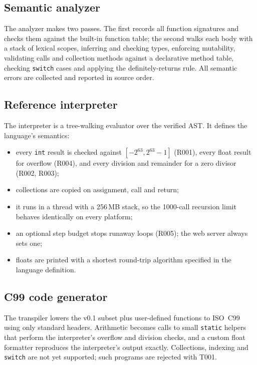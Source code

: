 \documentclass[conference]{IEEEtran}
\begin{document}
\subsection{Semantic analyzer}
The analyzer makes two passes. The first records all function signatures and checks them against the
built-in function table; the second walks each body with a stack of lexical scopes, inferring and checking
types, enforcing mutability, validating calls and collection methods against a declarative method table,
checking \texttt{switch} cases and applying the definitely-returns rule. All semantic errors are collected and
reported in source order.

\subsection{Reference interpreter}
The interpreter is a tree-walking evaluator over the verified AST. It defines the language's semantics:
\begin{itemize}
  \item every \texttt{int} result is checked against $[-2^{63}, 2^{63}-1]$ (R001), every float result for
        overflow (R004), and every division and remainder for a zero divisor (R002, R003);
  \item collections are copied on assignment, call and return;
  \item it runs in a thread with a 256\,MB stack, so the 1000-call recursion limit behaves identically on
        every platform;
  \item an optional step budget stops runaway loops (R005); the web server always sets one;
  \item floats are printed with a shortest round-trip algorithm specified in the language definition.
\end{itemize}

\subsection{C99 code generator}
The transpiler lowers the v0.1 subset plus user-defined functions to ISO~C99~\cite{iso_c99} using only
standard headers. Arithmetic becomes calls to small \texttt{static} helpers that perform the interpreter's
overflow and division checks, and a custom float formatter reproduces the interpreter's output exactly.
Collections, indexing and \texttt{switch} are not yet supported; such programs are rejected with T001.

\end{document}
